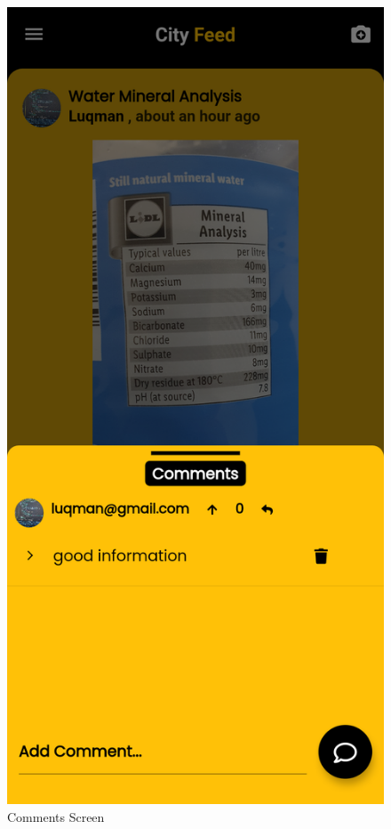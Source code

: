 \begin{figure}[H]
    \centering
    \includegraphics[scale=0.14]{App Screenshots/Comments.png}
    \caption{Comments Screen}
    \label{fig:Comments Screen}
\end{figure}

